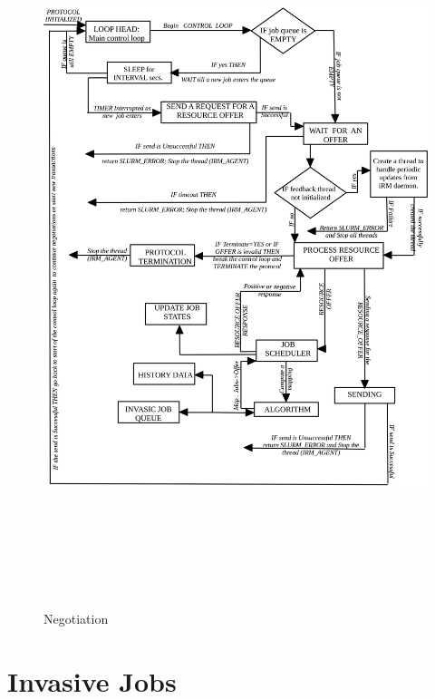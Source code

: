 \clearpage
\begin{figure}[h]
\centering
\includegraphics[width=1.0\textwidth, height=210mm]{./figures/Negotiation.pdf}
\caption{Negotiation}
\label{fig:Neg}
\end{figure}
\clearpage

\section{Invasive Jobs}

